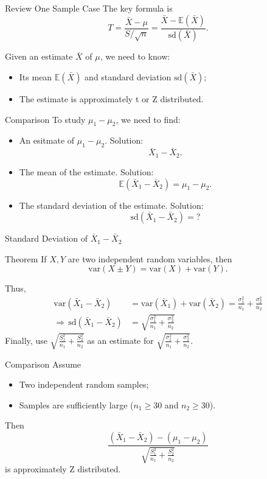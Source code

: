 \documentclass{beamer}
\newcommand{\E}{\mathbb{E}}
\newcommand{\var}{\text{var}}
\newcommand{\sd}{\text{sd}}
\let\thefootnote\relax\footnotetext{\tiny{*  Office Hours: Wed \& Fri 10:00 - 11:30 AM, KMC 8-174}}
\begin{document}
\begin{frame}{Review One Sample Case}
The key formula is
\[
T = \frac{\bar X - \mu}{S/\sqrt{n}} = \frac{\bar X - \E (\bar X)}{\sd(\bar X)}.
\]

Given an estimate $\bar X$ of $\mu$, we need to know:
\begin{itemize}
\item Its mean $\E(\bar X)$ and standard deviation $\sd(\bar X)$;
\item The estimate is approximately t or Z distributed.
\end{itemize}
\end{frame}

\begin{frame}{Comparison}
To study $\mu_1-\mu_2$, we need to find:
\begin{itemize}
\item An esitmate of $\mu_1-\mu_2$. Solution:
$$ \bar X_1 - \bar X_2.$$
\item The mean of the estimate. Solution:
$$\E (\bar X_1 - \bar X_2) = \mu_1-\mu_2.$$
\item The standard deviation of the estimate. Solution:
$$\sd (\bar X_1 - \bar X_2) = ? $$
\end{itemize}
\end{frame}

\begin{frame}{Standard Deviation of $\bar X_1 - \bar X_2$}
\begin{block}{Theorem}
If $X,Y$ are two independent random variables, then $$\var(X\pm Y)=\var(X)+\var(Y).$$
\end{block}
Thus,
\begin{align*}
\var(\bar X_1 - \bar X_2) & = \var(\bar X_1) + \var(\bar X_2) = \frac{\sigma_1^2}{n_1} + \frac{\sigma_2^2}{n_2} \\
\Rightarrow \, \sd(\bar X_1 - \bar X_2) & = \sqrt{\frac{\sigma_1^2}{n_1} + \frac{\sigma_2^2}{n_2} }
\end{align*}
Finally, use $\sqrt{\frac{S_1^2}{n_1} + \frac{S_2^2}{n_2} }$ as an estimate for $\sqrt{\frac{\sigma_1^2}{n_1} + \frac{\sigma_2^2}{n_2} }$.
\end{frame}

\begin{frame}{Comparison}
Assume
\begin{itemize}
\item Two independent random samples;
\item Samples are sufficiently large ($n_1\geq30$ and $n_2\geq30$).
\end{itemize}

Then 
\[
\frac{(\bar X_1 -\bar X_2) - (\mu_1 - \mu_2) }{\sqrt{\frac{S_1^2}{n_1} + \frac{S_2^2}{n_2} }}
\]
is approximately Z distributed.
\let\thefootnote\relax{}
\end{frame}
\end{document}

